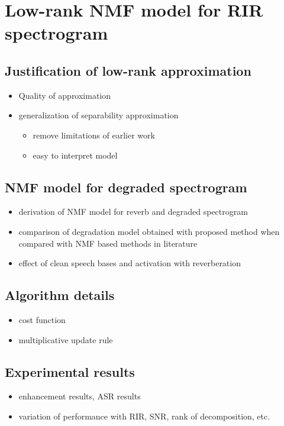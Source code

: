 \chapter{Low-rank NMF model for RIR spectrogram}
\label{chapter:trans2020}

\section{Justification of low-rank approximation}
\begin{itemize}
\item Quality of approximation
\item generalization of separability approximation
\begin{itemize}
\item remove limitations of earlier work
\item easy to interpret model
\end{itemize}
\end{itemize}

\section{NMF model for degraded spectrogram}
\begin{itemize}
\item derivation of NMF model for reverb and degraded spectrogram
\item comparison of degradation model obtained with proposed method when compared with NMF based methods in literature
\item effect of clean speech bases and activation with reverberation
\end{itemize}

\section{Algorithm details}
\begin{itemize}
\item cost function
\item multiplicative update rule
\end{itemize}

\section{Experimental results}
\begin{itemize}
\item enhancement results, ASR results
\item variation of performance with RIR, SNR, rank of decomposition, etc.
\end{itemize}


